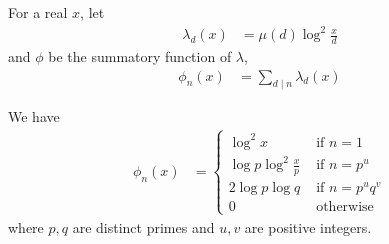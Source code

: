 \documentclass[elemannt.tex]{subfile}
\begin{document}
	For a real $x$, let
		\begin{align*}
			\lambda_{d}(x)
				& = \mu(d)\log^{2}{\frac{x}{d}}
		\end{align*}
	and $\phi$ be the summatory function of $\lambda$,
		\begin{align*}
			\phi_{n}(x)
			& = \sum_{d\mid n}\lambda_{d}(x)
		\end{align*}

		\begin{lemma}
			We have
				\begin{align*}
					\phi_{n}(x)
						& =
							\begin{cases}
								\log^{2}{x}& \mbox{ if }n=1\\
								\log{p}\log^{2}{\frac{x}{p}}& \mbox{ if }n=p^{u}\\
								2\log{p}\log{q}& \mbox{ if } n=p^{u}q^{v}\\
								0& \mbox{ otherwise}
							\end{cases}
				\end{align*}
			where $p,q$ are distinct primes and $u,v$ are positive integers.
		\end{lemma}
\end{document}
